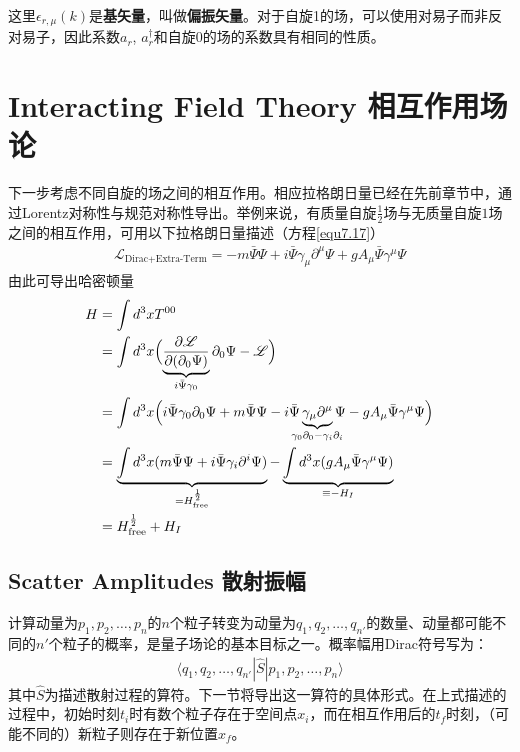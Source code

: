这里$\epsilon_{r,\mu}(k)$是{\bf 基矢量}，叫做{\bf 偏振矢量}。对于自旋1的场，可以使用对易子而非反对易子，因此系数$a_{r}$, $a_{r}^{\dagger}$和自旋$0$的场的系数具有相同的性质。

\section[相互作用场论]{Interacting Field Theory \quad 相互作用场论}\label{sec9.5}
下一步考虑不同自旋的场之间的相互作用。相应拉格朗日量已经在先前章节中，通过Lorentz对称性与规范对称性导出。举例来说，有质量自旋$\frac{1}{2}$场与无质量自旋$1$场之间的相互作用，可用以下拉格朗日量描述（方程\eqref{equ7.17}）
\begin{align}\label{equ9.45}
\mathscr{L}_\text{Dirac+Extra-Term}=-m\bar{\Psi}\Psi+i\bar{\Psi}\gamma_\mu\partial^\mu\Psi+gA_\mu\bar{\Psi}\gamma^\mu\Psi
\end{align}
由此可导出哈密顿量
\begin{align}
H&=\int{d^3x T^{00}}\nonumber\\
&=\int{d^3x\Bigl(\underbrace{\frac{\partial\mathscr{L}}{\partial(\partial_0\Psi)} }_{i\bar{\Psi}\gamma_0}\partial_0\Psi-\mathscr{L} \Bigl)}\nonumber\\
&=\int d^3x\Bigl( i\bar{\Psi}\gamma_0\partial_0\Psi+m\bar{\Psi}\Psi-i\bar{\Psi}\underbrace{\gamma_\mu\partial^\mu}_{\mathclap{\gamma_0\partial_0-\gamma_i\partial_i}}\Psi-gA_\mu\bar{\Psi}\gamma^\mu\Psi \Bigl)\nonumber\\
&=\underbrace{\int d^3x( m\bar{\Psi}\Psi+i\bar{\Psi}\gamma_i\partial^i\Psi)}_{=H^{\frac{1}{2}}_\text{free}}- \underbrace{\int d^3x (gA_\mu\bar{\Psi}\gamma^\mu\Psi )}_{\equiv-H_I}\nonumber\\
&=H_\text{free}^{\frac{1}{2}}+H_I \label{equ9.46}
\end{align}

\subsection[散射振幅]{Scatter Amplitudes \quad 散射振幅}\label{sec9.5.1}
计算动量为$p_1,p_2,\ldots,p_n$的$n$个粒子转变为动量为$q_1,q_2,\ldots,q_{n'}$的数量、动量都可能不同的$n'$个粒子的概率，是量子场论的基本目标之一。概率幅用Dirac符号写为：
\begin{align}\label{equ9.47}
\langle q_1,q_2,\ldots,q_{n'}|\hat{S}|p_1,p_2,\ldots,p_n\rangle
\end{align}
其中$\hat{S}$为描述散射过程的算符。下一节将导出这一算符的具体形式。在上式描述的过程中，初始时刻$t_i$时有数个粒子存在于空间点$x_i$，而在相互作用后的$t_f$时刻，（可能不同的）新粒子则存在于新位置$x_f$。

